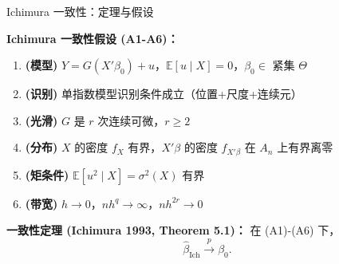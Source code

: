 \documentclass[aspectratio=169, 10pt]{beamer}
\begin{document}
\begin{frame}{Ichimura 一致性：定理与假设}

  \begin{assumptionbox}
  \textbf{Ichimura 一致性假设 (A1-A6)：}
  \begin{enumerate}\setlength{\itemsep}{1pt}
    \item \textbf{(模型)} $Y = G(X'\beta_0) + u$，$\mathbb{E}[u \mid X] = 0$，$\beta_0 \in$ 紧集 $\Theta$
    \item \textbf{(识别)} 单指数模型识别条件成立（位置+尺度+连续元）
    \item \textbf{(光滑)} $G$ 是 $r$ 次连续可微，$r \geq 2$
    \item \textbf{(分布)} $X$ 的密度 $f_X$ 有界，$X'\beta$ 的密度 $f_{X'\beta}$ 在 $A_n$ 上有界离零
    \item \textbf{(矩条件)} $\mathbb{E}[u^2 \mid X] = \sigma^2(X)$ 有界
    \item \textbf{(带宽)} $h \to 0$，$nh^q \to \infty$，$nh^{2r} \to 0$
  \end{enumerate}
  \end{assumptionbox}

  \begin{highlightbox}
    \textbf{一致性定理 (Ichimura 1993, Theorem 5.1)：}
    在 (A1)-(A6) 下，
    $$\hat\beta_{\text{Ich}} \overset{p}{\to} \beta_0.$$
  \end{highlightbox}

  \hypertarget{main-c5}{}
  \hfill{\scriptsize\hyperlink{proof-c5}{}}

\end{frame}
\end{document}
